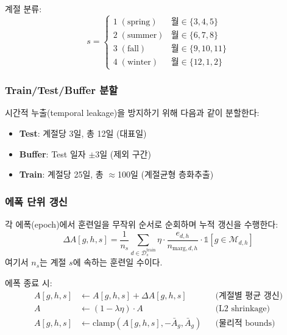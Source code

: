 \documentclass[11pt, a4paper]{article}
\begin{document}
계절 분류:
\begin{equation}
    s = \begin{cases}
        1 \; (\text{spring}) & \text{월} \in \{3, 4, 5\} \\
        2 \; (\text{summer}) & \text{월} \in \{6, 7, 8\} \\
        3 \; (\text{fall})   & \text{월} \in \{9, 10, 11\} \\
        4 \; (\text{winter}) & \text{월} \in \{12, 1, 2\}
    \end{cases}
\end{equation}

\subsubsection{Train/Test/Buffer 분할}

시간적 누출(temporal leakage)을 방지하기 위해 다음과 같이 분할한다:
\begin{itemize}[noitemsep]
    \item \textbf{Test}: 계절당 3일, 총 12일 (대표일)
    \item \textbf{Buffer}: Test 일자 $\pm 3$일 (제외 구간)
    \item \textbf{Train}: 계절당 25일, 총 $\approx$100일 (계절균형 층화추출)
\end{itemize}

\subsubsection{에폭 단위 갱신}

각 에폭(epoch)에서 훈련일을 무작위 순서로 순회하며 누적 갱신을 수행한다:
\begin{equation}
    \Delta A[g, h, s] = \frac{1}{n_s} \sum_{d \in \mathcal{D}_s^{\text{train}}} \eta \cdot \frac{e_{d,h}}{n_{\text{marg},d,h}}
    \cdot \mathbb{1}[g \in \mathcal{M}_{d,h}]
\end{equation}
여기서 $n_s$는 계절 $s$에 속하는 훈련일 수이다.

에폭 종료 시:
\begin{align}
    A[g, h, s] &\leftarrow A[g, h, s] + \Delta A[g, h, s] && \text{(계절별 평균 갱신)} \\
    A &\leftarrow (1 - \lambda\eta) \cdot A && \text{(L2 shrinkage)} \\
    A[g, h, s] &\leftarrow \text{clamp}(A[g, h, s], -\bar{A}_g, \bar{A}_g) && \text{(물리적 bounds)}
\end{align}
\end{document}
